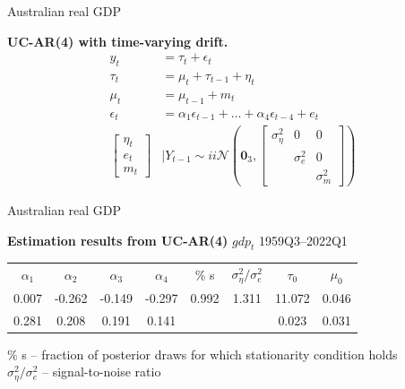 \documentclass[notes,blackandwhite,mathsans,usenames,dvipsnames]{beamer}
\begin{document}
\begin{frame}{Australian real GDP}

\bigskip\textbf{UC-AR(4) with time-varying drift.}
\begin{align*}
y_t &= \tau_t + \epsilon_t\\[1ex]
\tau_t &= \mu_t + \tau_{t-1} + \eta_t\\[1ex]
\mu_t &= \mu_{t-1} + m_t\\[1ex]
\epsilon_t &= \alpha_1\epsilon_{t-1} + \dots + \alpha_4\epsilon_{t-4} +  e_t\\[2ex]
\begin{bmatrix}\eta_t \\ e_t\\ m_t\end{bmatrix}&\bigg|Y_{t-1} \sim ii\mathcal{N}\left(\mathbf{0}_3, \begin{bmatrix}\sigma_\eta^2 & 0 & 0 \\  & \sigma_e^2 &0 \\
&&\sigma_m^2\end{bmatrix} \right)
\end{align*}

\end{frame}



\begin{frame}{Australian real GDP}

\begin{adjustwidth}{-0.5cm}{0cm}
\begin{center}
\textbf{Estimation results from UC-AR(4)} {\color{mcxs2}$gdp_t$ 1959Q3--2022Q1}

\small\smallskip\begin{tabular}{cccccccc}
\toprule
$\alpha_1$ & $\alpha_2$ & $\alpha_3$ & $\alpha_4$& \% s  & $\sigma^2_\eta / \sigma^2_e$& $\tau_0$ & $\mu_0$\\[1ex]
 0.007& -0.262& -0.149& -0.297&  0.992&  1.311& 11.072&  0.046\\
0.281& 0.208& 0.191& 0.141&    &    & 0.023& 0.031\\[1ex]
\bottomrule
\end{tabular}

\smallskip 
\% s -- fraction of posterior draws for which stationarity condition holds\\
$\sigma^2_\eta / \sigma^2_e$ -- signal-to-noise ratio
\end{center}
\end{adjustwidth}
\end{frame}
\end{document}
